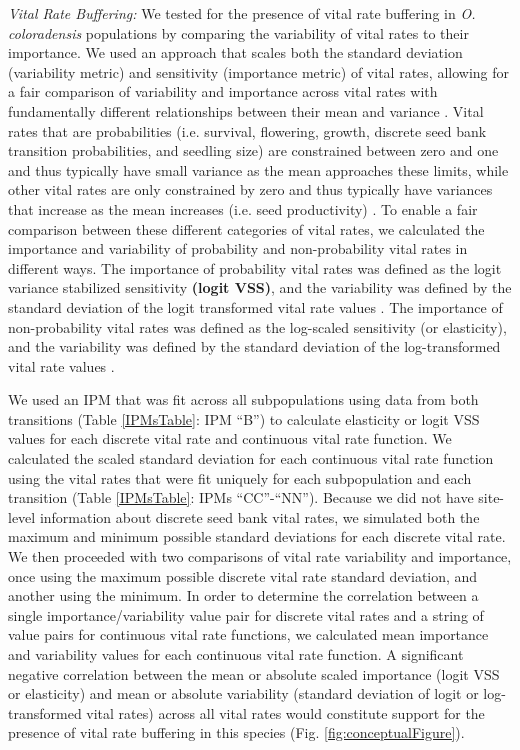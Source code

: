 \documentclass[12pt, letterpaper]{article}
\begin{document}
\textit{Vital Rate Buffering:} We tested for the presence of vital rate buffering in \textit{O. coloradensis} populations by comparing the variability of vital rates to their importance. We used an approach that scales both the standard deviation (variability metric) and sensitivity (importance metric) of vital rates, allowing for a fair comparison of variability and importance across vital rates with fundamentally different relationships between their mean and variance \cite{McDonald2017DivergentEnvironments}. Vital rates that are probabilities (i.e. survival, flowering, growth, discrete seed bank transition probabilities, and seedling size) are constrained between zero and one and thus typically have small variance as the mean approaches these limits, while other vital rates are only constrained by zero and thus typically have variances that increase as the mean increases (i.e. seed productivity) \cite{Gaillard2003-ch}. To enable a fair comparison between these different categories of vital rates, we calculated the importance and variability of probability and non-probability vital rates in different ways. The importance of probability vital rates was defined as the logit variance stabilized sensitivity \textbf{(logit VSS)}, and the variability was defined by the standard deviation of the logit transformed vital rate values \cite{McDonald2017DivergentEnvironments, William_A_Link_Paul_F_Doherty_Fr2002-cb}. The importance of non-probability vital rates was defined as the log-scaled sensitivity (or elasticity), and the variability was defined by the standard deviation of the log-transformed vital rate values \cite{McDonald2017DivergentEnvironments, Morris2002QuantitativeAnalysis}.

We used an IPM that was fit across all subpopulations using data from both transitions (Table \ref{IPMsTable}: IPM “B”) to calculate elasticity or logit VSS values for each discrete vital rate and continuous vital rate function. 
We calculated the scaled standard deviation for each continuous vital rate function using the vital rates that were fit uniquely for each subpopulation and each transition (Table \ref{IPMsTable}: IPMs “CC”-“NN”). Because we did not have site-level information about discrete seed bank vital rates, we simulated both the maximum and minimum possible standard deviations for each discrete vital rate. We then proceeded with two comparisons of vital rate variability and importance, once using the maximum possible discrete vital rate standard deviation, and another using the minimum. In order to determine the correlation between a single importance/variability value pair for discrete vital rates and a string of value pairs for continuous vital rate functions, we calculated mean importance and variability values for each continuous vital rate function. A significant negative correlation between the mean or absolute scaled importance (logit VSS or elasticity) and mean or absolute variability (standard deviation of logit or log-transformed vital rates) across all vital rates would constitute support for the presence of vital rate buffering in this species
(Fig. \ref{fig:conceptualFigure}).  
\end{document}
